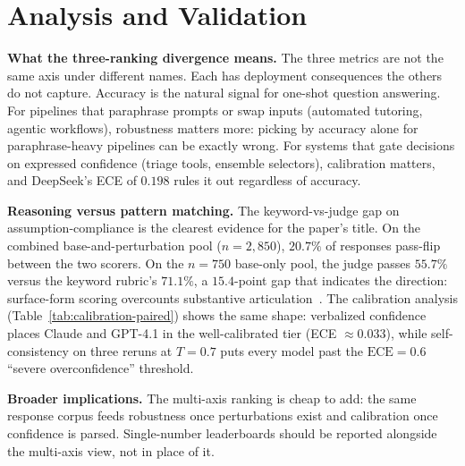
\section{Analysis and Validation}
\label{sec:discussion}

\textbf{What the three-ranking divergence means.} The three metrics
are not the same axis under different names. Each has deployment
consequences the others do not capture. Accuracy is the natural
signal for one-shot question answering. For pipelines that
paraphrase prompts or swap inputs (automated tutoring, agentic
workflows), robustness matters more: picking by accuracy alone for
paraphrase-heavy pipelines can be exactly wrong. For systems that
gate decisions on expressed confidence (triage tools, ensemble
selectors), calibration matters, and DeepSeek's ECE of $0.198$
rules it out regardless of accuracy.

\textbf{Reasoning versus pattern matching.} The keyword-vs-judge
gap on assumption-compliance is the clearest evidence for the paper's
title. On the combined base-and-perturbation pool ($n = 2{,}850$),
$20.7\%$ of responses pass-flip between the two scorers. On the
$n=750$ base-only pool, the judge passes $55.7\%$ versus the
keyword rubric's $71.1\%$, a $15.4$-point gap that indicates the
direction: surface-form scoring overcounts substantive
articulation~\cite{du2025icecream}. The calibration analysis
(Table~\ref{tab:calibration-paired}) shows the same shape:
verbalized confidence places Claude and GPT-4.1 in the
well-calibrated tier (ECE $\approx 0.033$), while self-consistency
on three reruns at $T = 0.7$ puts every model past the
$\text{ECE} = 0.6$ ``severe overconfidence'' threshold.

\textbf{Broader implications.} The multi-axis ranking is cheap to
add: the same response corpus feeds robustness once perturbations
exist and calibration once confidence is parsed. Single-number
leaderboards should be reported alongside the multi-axis view, not
in place of it.

